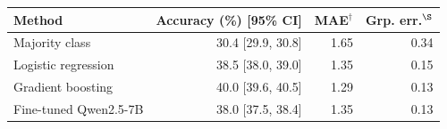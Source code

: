 \setlength{\tabcolsep}{3pt}
\begin{tabular}{@{}lrrr@{}}
\toprule
\textbf{Method} & \textbf{Accuracy (\%) [95\% CI]} & \textbf{MAE}$^\dagger$ & \textbf{Grp. err.}$^\S$ \\
\midrule
Majority class & 30.4 [29.9, 30.8] & 1.65 & 0.34 \\
Logistic regression & 38.5 [38.0, 39.0] & 1.35 & 0.15 \\
Gradient boosting & 40.0 [39.6, 40.5] & 1.29 & 0.13 \\
Fine-tuned Qwen2.5-7B & 38.0 [37.5, 38.4] & 1.35 & 0.13 \\
\bottomrule
\end{tabular}